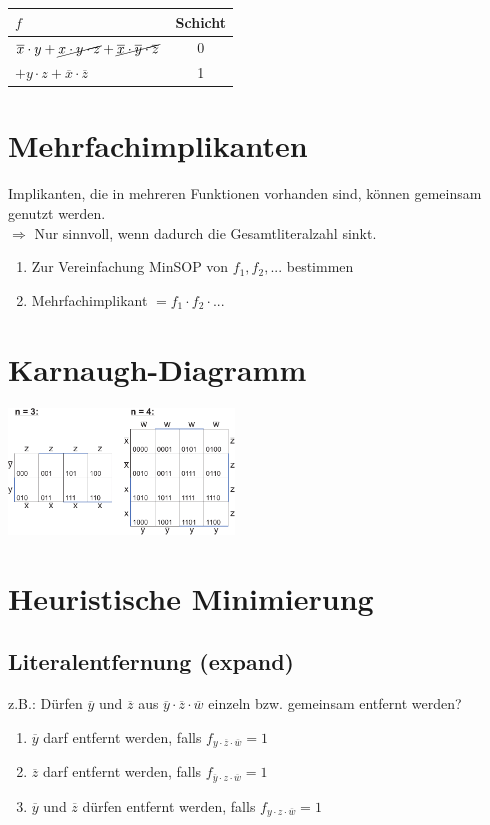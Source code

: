 \documentclass[a4paper,twocolumn,10pt]{article}
\begin{document}
\begin{tabular}{|l|c|}
\hline $f$ & Schicht \\ 
\hline $\overline{x}\cdot y+\cancel{x\cdot y\cdot z} + \cancel{\overline{x}\cdot\overline{y}\cdot\overline{z}}$ & 0 \\ 
\hline $+ y\cdot z+\overline{x}\cdot\overline{z}$ & 1 \\ 
\hline 
\end{tabular}

\section*{Mehrfachimplikanten}
Implikanten, die in mehreren Funktionen vorhanden sind, können gemeinsam genutzt werden.\\
$\Rightarrow$ Nur sinnvoll, wenn dadurch die Gesamtliteralzahl sinkt.
\begin{enumerate}
	\item Zur Vereinfachung MinSOP von $f_1, f_2,...$ bestimmen
	\item Mehrfachimplikant $=f_1\cdot f_2\cdot ...$
\end{enumerate}

\section*{Karnaugh-Diagramm}
\includegraphics[width=0.45\textwidth]{Grafiken/Karnaugh}

\section*{Heuristische Minimierung}
\subsection*{Literalentfernung (expand)}
z.B.: Dürfen $\overline{y}$ und $\overline{z}$ aus $\overline{y} \cdot\overline{z} \cdot\overline{w}$ einzeln bzw. gemeinsam entfernt werden?
\begin{enumerate}[label=-]
	\item $\overline{y}$ darf entfernt werden, falls $f_{y \cdot\overline{z} \cdot\overline{w}}=1$
	\item $\overline{z}$ darf entfernt werden, falls $f_{\overline{y} \cdot z \cdot\overline{w}}=1$
	\item $\overline{y}$ und $\overline{z}$ dürfen entfernt werden, falls $f_{y \cdot z \cdot\overline{w}}=1$
\end{enumerate}
\end{document}
